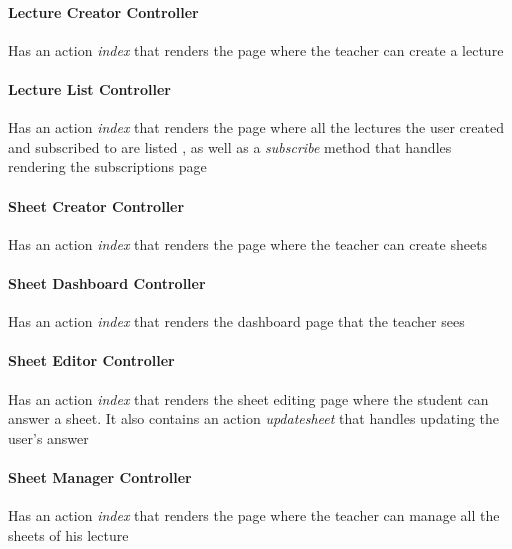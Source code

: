 \paragraph{Lecture Creator Controller} Has an action \textit{index} that renders the page where the teacher can create a lecture
\paragraph{Lecture List Controller} Has an action \textit{index} that renders the page where all the lectures the user created and subscribed to are listed , as well as a \textit{subscribe} method that handles rendering the subscriptions page
\paragraph{Sheet Creator Controller} Has an action \textit{index} that renders the page where the teacher can create sheets
\paragraph{Sheet Dashboard Controller} Has an action \textit{index} that renders the dashboard page that the teacher sees
\paragraph{Sheet Editor Controller} Has an action \textit{index} that renders the sheet editing page where the student can answer a sheet. It also contains an action \textit{update\textunderscore sheet}  that handles updating the user's answer
\paragraph{Sheet Manager Controller} Has an action \textit{index} that renders the page where the teacher can manage all the sheets of his lecture
